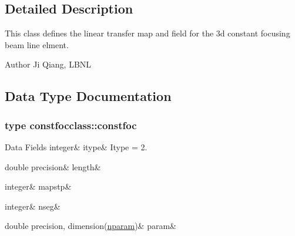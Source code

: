 \subsection{Detailed Description}
This class defines the linear transfer map and field for the 3d constant focusing beam line elment. 

\begin{DoxyAuthor}{Author}
Ji Qiang, L\+B\+NL 
\end{DoxyAuthor}


\subsection{Data Type Documentation}
\label{structconstfocclass_1_1constfoc}
\subsubsection{type constfocclass\+::constfoc}
\begin{DoxyFields}{Data Fields}
\mbox{\label{namespaceconstfocclass_a6805e237c322783df518e8f2c3e1feec}} 
integer&
itype&
Itype = 2. \\
\hline

\mbox{\label{namespaceconstfocclass_a20a95ee3a0c6fd8f128d4fbe911077db}} 
double precision&
length&
\\
\hline

\mbox{\label{namespaceconstfocclass_a7211bb49a75643cd5898f13851eb852e}} 
integer&
mapstp&
\\
\hline

\mbox{\label{namespaceconstfocclass_ad5d129a88d9e84629813d001b6379bf5}} 
integer&
nseg&
\\
\hline

\mbox{\label{namespaceconstfocclass_a91cddf45b9010e35e24ae6cd063a9ee7}} 
double precision, dimension(\mbox{\hyperlink{namespaceconstfocclass_a4a04b85ebc26340b40e7c38cfad62bc1}{nparam}})&
param&
\\
\hline

\end{DoxyFields}


